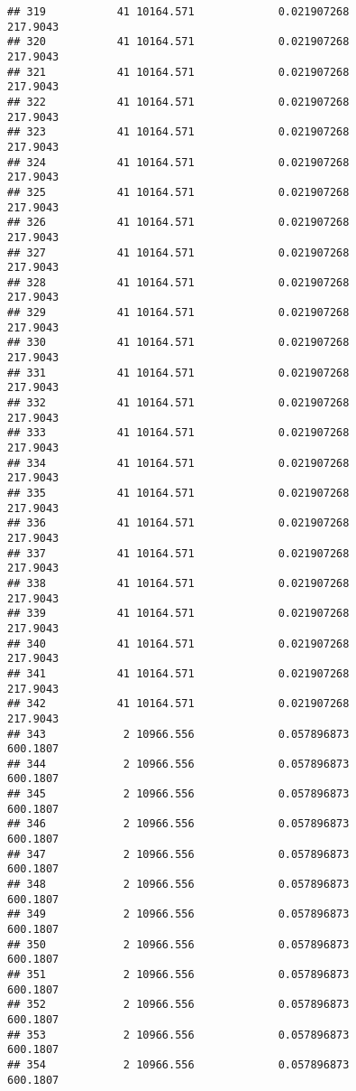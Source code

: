 \documentclass[]{article}
\begin{document}
\begin{verbatim}
## 319           41 10164.571             0.021907268           217.9043
## 320           41 10164.571             0.021907268           217.9043
## 321           41 10164.571             0.021907268           217.9043
## 322           41 10164.571             0.021907268           217.9043
## 323           41 10164.571             0.021907268           217.9043
## 324           41 10164.571             0.021907268           217.9043
## 325           41 10164.571             0.021907268           217.9043
## 326           41 10164.571             0.021907268           217.9043
## 327           41 10164.571             0.021907268           217.9043
## 328           41 10164.571             0.021907268           217.9043
## 329           41 10164.571             0.021907268           217.9043
## 330           41 10164.571             0.021907268           217.9043
## 331           41 10164.571             0.021907268           217.9043
## 332           41 10164.571             0.021907268           217.9043
## 333           41 10164.571             0.021907268           217.9043
## 334           41 10164.571             0.021907268           217.9043
## 335           41 10164.571             0.021907268           217.9043
## 336           41 10164.571             0.021907268           217.9043
## 337           41 10164.571             0.021907268           217.9043
## 338           41 10164.571             0.021907268           217.9043
## 339           41 10164.571             0.021907268           217.9043
## 340           41 10164.571             0.021907268           217.9043
## 341           41 10164.571             0.021907268           217.9043
## 342           41 10164.571             0.021907268           217.9043
## 343            2 10966.556             0.057896873           600.1807
## 344            2 10966.556             0.057896873           600.1807
## 345            2 10966.556             0.057896873           600.1807
## 346            2 10966.556             0.057896873           600.1807
## 347            2 10966.556             0.057896873           600.1807
## 348            2 10966.556             0.057896873           600.1807
## 349            2 10966.556             0.057896873           600.1807
## 350            2 10966.556             0.057896873           600.1807
## 351            2 10966.556             0.057896873           600.1807
## 352            2 10966.556             0.057896873           600.1807
## 353            2 10966.556             0.057896873           600.1807
## 354            2 10966.556             0.057896873           600.1807

\end{verbatim}
\end{document}
